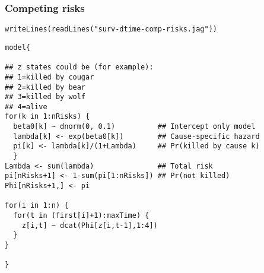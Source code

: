 \documentclass[color=usenames,dvipsnames]{beamer}\usepackage[]{graphicx}\usepackage[]{color}
\makeatletter
\newcommand{\hlstr}[1]{\textcolor[rgb]{0.749,0.012,0.012}{#1}}%
\newcommand{\hlstd}[1]{\textcolor[rgb]{0,0,0}{#1}}%
\newcommand{\hlkwd}[1]{\textcolor[rgb]{0.004,0.004,0.506}{#1}}%
\newenvironment{kframe}{%
 \def\at@end@of@kframe{}%
 \ifinner\ifhmode%
  \def\at@end@of@kframe{\end{minipage}}%
  \begin{minipage}{\columnwidth}%
 \fi\fi%
 \def\FrameCommand##1{\hskip\@totalleftmargin \hskip-\fboxsep
 \colorbox{shadecolor}{##1}\hskip-\fboxsep
     \hskip-\linewidth \hskip-\@totalleftmargin \hskip\columnwidth}%
 \MakeFramed {\advance\hsize-\width
   \@totalleftmargin\z@ \linewidth\hsize
   \@setminipage}}%
 {\par\unskip\endMakeFramed%
 \at@end@of@kframe}
\newenvironment{knitrout}{}{} %
\makeatother
\begin{document}
\begin{frame}[fragile]
  \frametitle{Competing risks}
\begin{knitrout}\scriptsize
{}\color{fgcolor}\begin{kframe}
\begin{alltt}
\hlkwd{writeLines}\hlstd{(}\hlkwd{readLines}\hlstd{(}\hlstr{"surv-dtime-comp-risks.jag"}\hlstd{))}
\end{alltt}
\end{kframe}
\end{knitrout}
\vspace{-6pt}
\begin{knitrout}\scriptsize
{}\color{fgcolor}\begin{kframe}
\begin{verbatim}
model{

## z states could be (for example):
## 1=killed by cougar
## 2=killed by bear
## 3=killed by wolf
## 4=alive
for(k in 1:nRisks) {
  beta0[k] ~ dnorm(0, 0.1)          ## Intercept only model
  lambda[k] <- exp(beta0[k])        ## Cause-specific hazard
  pi[k] <- lambda[k]/(1+Lambda)     ## Pr(killed by cause k)
  }
Lambda <- sum(lambda)               ## Total risk
pi[nRisks+1] <- 1-sum(pi[1:nRisks]) ## Pr(not killed)
Phi[nRisks+1,] <- pi

for(i in 1:n) {
  for(t in (first[i]+1):maxTime) {
    z[i,t] ~ dcat(Phi[z[i,t-1],1:4])
  }
}

}
\end{verbatim}
\end{kframe}
\end{knitrout}
\end{frame}
\end{document}
